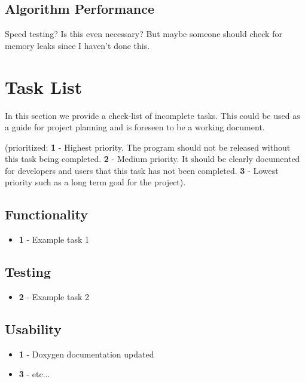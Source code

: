 \documentclass[]{Photos_interface_design}
\begin{document}
\subsection{Algorithm Performance}
Speed testing? Is this even necessary? But maybe someone should check for
memory leaks since I haven't done this.

\newpage

{}


\newpage

\section*{Task List}
In this section we provide a check-list of incomplete tasks.
This could be used as a guide for project planning and is foreseen
to be a working document. 

(prioritized: {\bf 1} - Highest priority. The program should not be
released without this task being completed. {\bf 2} - Medium priority.
It should be clearly documented for developers and users that this task has not
been completed. {\bf 3} - Lowest priority such as a long term goal 
for the project).

\subsection*{Functionality}
\begin{itemize}
  \item[\ding{111}]{\bf 1} - Example task 1
\end{itemize}

\subsection*{Testing}
\begin{itemize}
  \item[\ding{111}]{\bf 2} - Example task 2
\end{itemize}

\subsection*{Usability}
\begin{itemize}
  \item[\ding{111}]{\bf 1} - Doxygen documentation updated
  \item[\ding{111}]{\bf 3} - etc...
\end{itemize}
\end{document}
